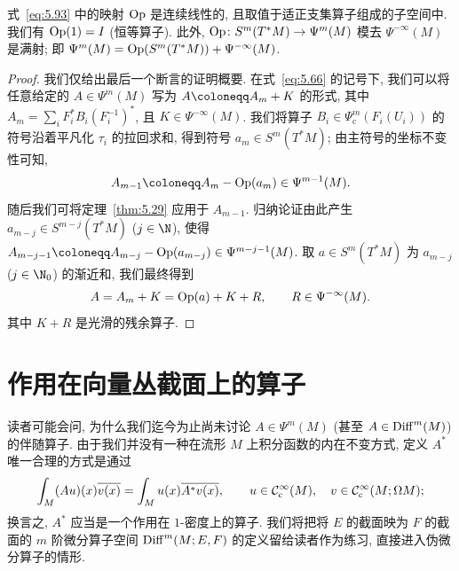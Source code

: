 \begin{proposition}[量化映射的性质]\label{prop:5.41}
式~\eqref{eq:5.93} 中的映射 $\operatorname{Op}$ 是连续线性的, 且取值于适正支集算子组成的子空间中. 我们有 $\operatorname{Op}(1) = I$ (恒等算子). 此外, $\operatorname{Op} \colon S^m(T^* M) \to \Psi^m(M)$ 模去 $\Psi^{-\infty}(M)$ 是满射; 即 $\Psi^m(M) = \operatorname{Op}(S^m(T^* M)) + \Psi^{-\infty}(M)$.
\end{proposition}

\begin{proof}
我们仅给出最后一个断言的证明概要. 在式~\eqref{eq:5.66} 的记号下, 我们可以将任意给定的 $A \in \Psi^m(M)$ 写为 $A \defeq A_m + K$ 的形式, 其中 $A_m = \sum_i F_i^* B_i (F_i^{-1})^*$, 且 $K \in \Psi^{-\infty}(M)$. 我们将算子 $B_i \in \Psi_{\mathrm{c}}^m(F_i(U_i))$ 的符号沿着平凡化 $\tau_i$ 的拉回求和, 得到符号 $a_m \in S^m(T^* M)$; 由主符号的坐标不变性可知,
\begin{equation}\label{eq:5.94}
    A_{m-1} \defeq A_m - \Op(a_m) \in \Psi^{m-1}(M).
\end{equation}
随后我们可将定理~\ref{thm:5.29} 应用于 $A_{m-1}$. 归纳论证由此产生 $a_{m-j} \in S^{m-j}(T^* M)$ ($j \in \N$), 使得 $A_{m-j-1} \defeq A_{m-j} - \Op(a_{m-j}) \in \Psi^{m-j-1}(M)$. 取 $a \in S^m(T^* M)$ 为 $a_{m-j}$ ($j \in \N_0$) 的渐近和, 我们最终得到
\begin{equation}\label{eq:5.95}
    A = A_m + K = \operatorname{Op}(a) + K + R, \qquad R \in \Psi^{-\infty}(M).
\end{equation}
其中 $K + R$ 是光滑的残余算子.
\end{proof}

\section{作用在向量丛截面上的算子}\label{sec:5.7}
%

读者可能会问, 为什么我们迄今为止尚未讨论 $A \in \Psi^m(M)$ (甚至 $A \in \operatorname{Diff}^m(M)$) 的伴随算子. 由于我们并没有一种在流形 $M$ 上积分函数的内在不变方式, 定义 $A^*$ 唯一合理的方式是通过
\begin{equation}\label{eq:5.96}
    \int_M (A u)(x) \overline{v(x)} = \int_M u(x) \overline{A^* v(x)}, \qquad u \in \mathcal{C}_{\mathrm{c}}^\infty(M), \quad v \in \mathcal{C}_{\mathrm{c}}^\infty(M; \Omega M);
\end{equation}
换言之, $A^*$ 应当是一个作用在 $1$-密度上的算子. 我们将把将 $E$ 的截面映为 $F$ 的截面的 $m$ 阶微分算子空间 $\operatorname{Diff}^m(M; E, F)$ 的定义留给读者作为练习, 直接进入伪微分算子的情形.

